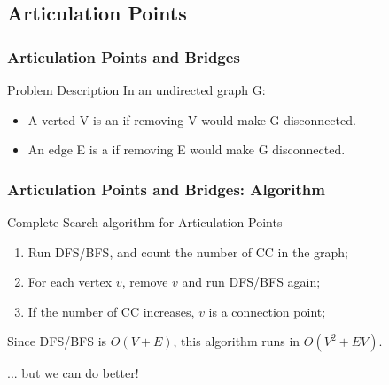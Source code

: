 \subsection{Articulation Points}

\begin{frame}
  \frametitle{Articulation Points and Bridges}
  {\smaller
    \begin{block}{Problem Description}
      In an undirected graph G:
      \begin{itemize}
      \item A verted V is an  if removing V would make G disconnected.
      \item An edge E is a  if removing E would make G disconnected.
      \end{itemize}
    \end{block}
    \begin{center}
      \end{center}
  }
\end{frame}

\begin{frame}
  \frametitle{Articulation Points and Bridges: Algorithm}
  {\smaller
    \begin{block}{Complete Search algorithm for Articulation Points}
      \begin{enumerate}
      \item Run DFS/BFS, and count the number of CC in the graph;
      \item For each vertex $v$, remove $v$ and run DFS/BFS again;
      \item If the number of CC increases, $v$ is a connection point;
      \end{enumerate}
      Since DFS/BFS is $O(V+E)$, this algorithm runs in $O(V^2+EV)$.
    \end{block}

    \bigskip

    \hfill ... but we can do better!
  }
\end{frame}

